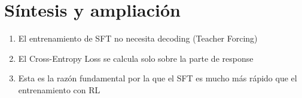 \documentclass[a4paper]{article}
\begin{document}
\newpage
\section{Síntesis y ampliación}
\begin{enumerate}
  \item El entrenamiento de SFT no necesita decoding (Teacher Forcing)
  \item El Cross-Entropy Loss se calcula solo sobre la parte de response
  \item Esta es la razón fundamental por la que el SFT es mucho más rápido que el entrenamiento con RL
\end{enumerate}
\end{document}
